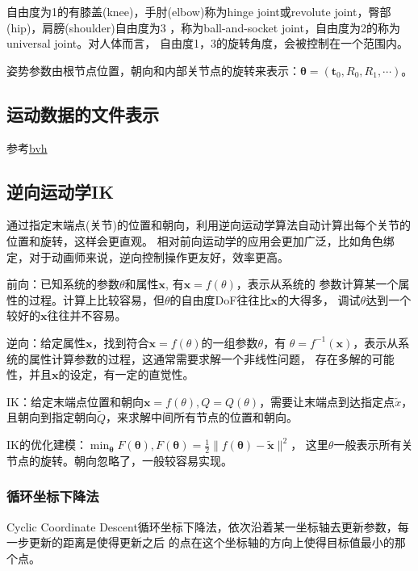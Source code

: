 \documentclass[lang=cn,newtx,10pt,scheme=chinese]{elegantbook}
\begin{document}
自由度为1的有膝盖(knee)，手肘(elbow)称为hinge joint或revolute joint，臀部(hip)，肩膀(shoulder)自由度为3
，称为ball-and-socket joint，自由度为2的称为universal joint。对人体而言，
自由度1，3的旋转角度，会被控制在一个范围内。

姿势参数由根节点位置，朝向和内部关节点的旋转来表示：$\boldsymbol{\theta}=(\boldsymbol{t}_0, R_0, R_1, \cdots)$。

\subsection{运动数据的文件表示}
参考\href{https://research.cs.wisc.edu/graphics/Courses/cs-838-1999/Jeff/BVH.html}{bvh}

\subsection{逆向运动学IK}
通过指定末端点(关节)的位置和朝向，利用逆向运动学算法自动计算出每个关节的位置和旋转，这样会更直观。
相对前向运动学的应用会更加广泛，比如角色绑定，对于动画师来说，逆向控制操作更友好，效率更高。

前向：已知系统的参数$\theta$和属性$\boldsymbol{x}$, 有$\boldsymbol{x}=f(\theta)$，表示从系统的
参数计算某一个属性的过程。计算上比较容易，但$\theta$的自由度DoF往往比$\boldsymbol{x}$的大得多，
调试$\theta$达到一个较好的$\boldsymbol{x}$往往并不容易。

逆向：给定属性$\boldsymbol{x}$，找到符合$\boldsymbol{x}=f(\theta)$的一组参数$\theta$，有
$\theta=f^{-1}(\boldsymbol{x})$，表示从系统的属性计算参数的过程，这通常需要求解一个非线性问题，
存在多解的可能性，并且$\boldsymbol{x}$的设定，有一定的直觉性。

IK：给定末端点位置和朝向$\boldsymbol{x}=f(\theta), 
Q=Q(\theta)$，需要让末端点到达指定点$\widetilde{x}$，且朝向到指定朝向$\widetilde{Q}$，来求解中间所有节点的位置和朝向。

IK的优化建模：$\min_{\boldsymbol{\theta}}F(\boldsymbol{\theta}), 
F(\boldsymbol{\theta}) = \frac{1}{2}\|f(\boldsymbol{\theta})-\widetilde{\boldsymbol{x}}\|^2$，
这里$\theta$一般表示所有关节点的旋转。朝向忽略了，一般较容易实现。


\subsubsection{循环坐标下降法}
Cyclic Coordinate Descent循环坐标下降法，依次沿着某一坐标轴去更新参数，每一步更新的距离是使得更新之后
的点在这个坐标轴的方向上使得目标值最小的那个点。
\end{document}
